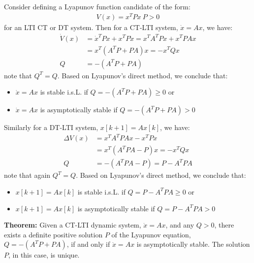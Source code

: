 \documentclass[twoside, 11pt]{article}
\begin{document}
Consider defining a Lyapunov function candidate of the form:
%
\begin{align*}
V(x) = x^T P x  \ P > 0
\end{align*}
%
for an LTI CT or DT system. Then for a CT-LTI system, $\dot{x} = A x$, we have:
%
\begin{align*}
\dot{V}(x) &= \dot{x}^T P x + x^T P \dot{x} = x^T A^T P x + x^T P A x 
\\
&= x^T (A^T P + P A) x = - x^T Q x
\\
Q &= - (A^T P + P A)
\end{align*}
%
note that $Q^T = Q$. Based on Lyapunov's direct method, we conclude that:
\begin{itemize}
\item $\dot{x} = A x$ is stable i.s.L. if $Q = -(A^T P + P A) \geq 0$ or 
%
\item $\dot{x} = A x$ is asymptotically stable if $Q = -(A^T P + P A) > 0$
\end{itemize}
%
Similarly for a DT-LTI system, $x[k+1] = A x[k]$, we have:
%
\begin{align*}
\Delta V(x) &= x^T A^T P A x - x^T P x 
\\
&= x^T (A^T P A - P) x = - x^T Q x
\\
Q &= - (A^T P A - P) = P - A^T P A
\end{align*}
%
note that again $Q^T = Q$. Based on Lyapunov's direct method, we conclude that:
\begin{itemize}
\item $x[k+1] = A x[k]$ is stable i.s.L. if $Q = P - A^T P A \geq 0$ or 
%
\item $x[k+1] = A x[k]$ is asymptotically stable if $Q = P - A^T P A > 0$
\end{itemize}
%

\textbf{Theorem:} Given a CT-LTI dynamic system, $\dot{x} = A x$, and 
any $Q>0$, there exists a definite positive solution $P$ of the Lyapunov equation, $Q = - (A^T P + P A)$, if and only if $\dot{x} = A x$ is asymptotically stable. The solution $P$, in this case, is unique.
\end{document}
